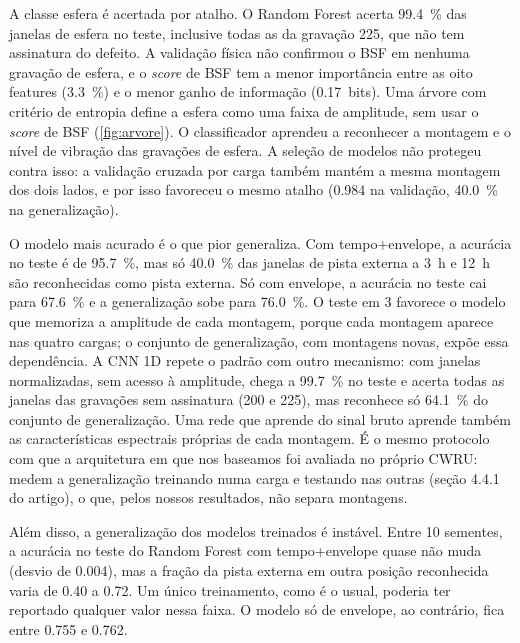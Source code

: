 A classe esfera é acertada por atalho. O Random Forest acerta
\SI{99.4}{\percent} das janelas de esfera no teste, inclusive todas as da
gravação 225, que não tem assinatura do defeito. A validação física não confirmou
o BSF em nenhuma gravação de esfera, e o \emph{score} de BSF tem a menor importância
entre as oito features (\SI{3.3}{\percent}) e o menor ganho de informação
(\SI{0.17}{bits}). Uma árvore com critério de entropia define a esfera como uma
faixa de amplitude, sem usar o \emph{score} de BSF (\autoref{fig:arvore}). O
classificador aprendeu a reconhecer a montagem e o nível de vibração das
gravações de esfera. A seleção de
modelos não protegeu contra isso: a validação cruzada por carga também mantém a
mesma montagem dos dois lados, e por isso favoreceu o mesmo atalho
(\num{0.984} na validação, \SI{40.0}{\percent} na generalização).

O modelo mais acurado é o que pior generaliza. Com tempo+envelope, a
acurácia no teste é de \SI{95.7}{\percent}, mas só \SI{40.0}{\percent} das janelas
de pista externa a 3~h e 12~h são reconhecidas como pista externa. Só com
envelope, a acurácia no teste cai para \SI{67.6}{\percent} e a generalização sobe
para \SI{76.0}{\percent}. O teste em \SI{3}{\hp} favorece o modelo que memoriza a
amplitude de cada montagem, porque cada montagem aparece nas quatro cargas; o
conjunto de generalização, com montagens novas, expõe essa dependência. A CNN 1D repete o
padrão com outro mecanismo: com janelas normalizadas, sem acesso à amplitude,
chega a \SI{99.7}{\percent} no teste e acerta todas as janelas das gravações sem
assinatura (200 e 225), mas reconhece só \SI{64.1}{\percent} do conjunto de
generalização. Uma rede que aprende do sinal bruto aprende também as características
espectrais próprias de cada montagem. É o mesmo protocolo com que a arquitetura em que nos
baseamos foi avaliada no próprio CWRU: \textcite{zhang2017} medem a
generalização treinando numa carga e testando nas outras (seção 4.4.1 do
artigo), o que, pelos nossos resultados, não separa montagens.

Além disso, a generalização dos modelos treinados é instável. Entre 10 sementes, a
acurácia no teste do Random Forest com tempo+envelope quase não muda (desvio de
\num{0.004}), mas a fração da pista externa em outra posição reconhecida varia de
\num{0.40} a \num{0.72}. Um único treinamento, como é o usual, poderia ter
reportado qualquer valor nessa faixa. O modelo só de envelope, ao contrário, fica
entre \num{0.755} e \num{0.762}.

